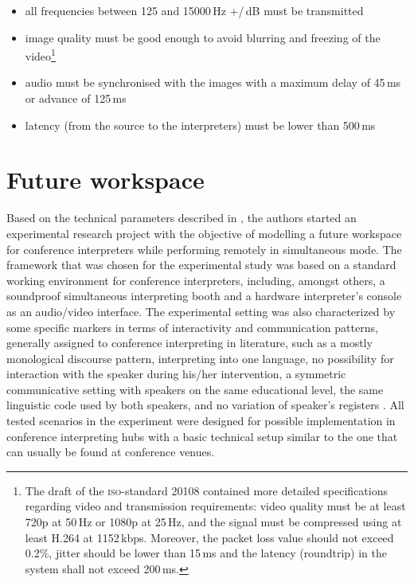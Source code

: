 \documentclass[output=paper]{langsci/langscibook}
\begin{document}
\begin{itemize}
\item all frequencies between 125 and 15000\,Hz +/\,dB must be transmitted \citep[3]{ISO20109}
\item image quality must be good enough to avoid blurring and freezing of the video\footnote{The draft of the \textsc{iso}-standard 20108 contained more detailed specifications regarding video and transmission requirements: video quality must be at least 720p at 50\,Hz or 1080p at 25\,Hz, and the signal must be compressed using at least H.264 at 1152\,kbps. Moreover, the packet loss value should not exceed 0.2\%, jitter should be lower than 15\,ms and the latency (roundtrip) in the system shall not exceed 200\,ms.}
\item audio must be synchronised with the images with a maximum delay of 45\,ms or advance of 125\,ms
\item latency (from the source to the interpreters) must be lower than 500\,ms \citep[7--8]{ISO20108}
\end{itemize}

\section{Future workspace}
\label{sec:ziegler:06}
Based on the technical parameters described in , the authors started an experimental research project with the objective of modelling a future workspace for conference interpreters while performing remotely in simultaneous mode. The framework that was chosen for the experimental study was based on a standard working environment for conference interpreters, including, amongst others, a soundproof simultaneous interpreting booth and a hardware interpreter’s console as an audio/video interface. The experimental setting was also characterized by some specific markers in terms of interactivity and communication patterns, generally assigned to conference interpreting in literature, such as a mostly monological discourse pattern, interpreting into one language, no possibility for interaction with the speaker during his/her intervention, a symmetric communicative setting with speakers on the same educational level, the same linguistic code used by both speakers, and no variation of speaker’s registers \citep[582--583]{Angelelli2000}. All tested scenarios in the experiment were designed for possible implementation in conference interpreting hubs with a basic technical setup similar to the one that can usually be found at conference venues.
\end{document}
